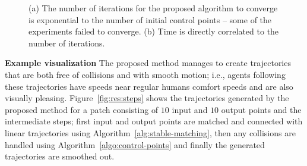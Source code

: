 \begin{figure}[t]
{		(a) The number of iterations for the proposed algorithm to converge is exponential to the number of initial control points -- some of the experiments failed to converge.
		(b) Time is directly correlated to the number of iterations.
}
\label{fig:res:performance}
\end{figure}



\textbf{Example visualization}
The proposed method manages to create trajectories that are both free of collisions and with smooth motion; i.e., agents following these trajectories have speeds near regular humans comfort speeds and are also visually pleasing.
Figure~\ref{fig:res:steps} shows the trajectories generated by the proposed method for a patch consisting of $10$ input and $10$ output points and the intermediate steps; first input and output points are matched and connected with linear trajectories using Algorithm~{\ref{alg:stable-matching}}, then any collisions are handled using Algorithm~\ref{algo:control-points} and finally the generated trajectories are smoothed out.

